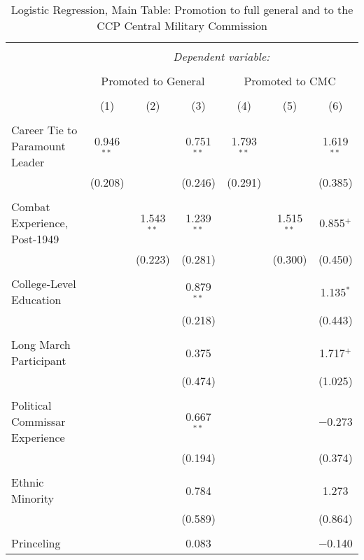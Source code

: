 
\begin{table}[!htbp] \centering 
  \caption{Logistic Regression, Main Table: Promotion to full general and to the CCP Central Military Commission} 
  \label{table_a8} 
\begin{tabular}{@{\extracolsep{5pt}}lcccccc} 
\\[-1.8ex]\hline 
\hline \\[-1.8ex] 
 & \multicolumn{6}{c}{\textit{Dependent variable:}} \\ 
\cline{2-7} 
\\[-1.8ex] & \multicolumn{3}{c}{Promoted to General} & \multicolumn{3}{c}{Promoted to CMC} \\ 
\\[-1.8ex] & (1) & (2) & (3) & (4) & (5) & (6)\\ 
\hline \\[-1.8ex] 
 Career Tie to Paramount Leader & 0.946$^{**}$ &  & 0.751$^{**}$ & 1.793$^{**}$ &  & 1.619$^{**}$ \\ 
  & (0.208) &  & (0.246) & (0.291) &  & (0.385) \\ 
  & & & & & & \\ 
 Combat Experience, Post-1949 &  & 1.543$^{**}$ & 1.239$^{**}$ &  & 1.515$^{**}$ & 0.855$^{+}$ \\ 
  &  & (0.223) & (0.281) &  & (0.300) & (0.450) \\ 
  & & & & & & \\ 
 College-Level Education &  &  & 0.879$^{**}$ &  &  & 1.135$^{*}$ \\ 
  &  &  & (0.218) &  &  & (0.443) \\ 
  & & & & & & \\ 
 Long March Participant &  &  & 0.375 &  &  & 1.717$^{+}$ \\ 
  &  &  & (0.474) &  &  & (1.025) \\ 
  & & & & & & \\ 
 Political Commissar Experience &  &  & 0.667$^{**}$ &  &  & $-$0.273 \\ 
  &  &  & (0.194) &  &  & (0.374) \\ 
  & & & & & & \\ 
 Ethnic Minority &  &  & 0.784 &  &  & 1.273 \\ 
  &  &  & (0.589) &  &  & (0.864) \\ 
  & & & & & & \\ 
 Princeling &  &  & 0.083 &  &  & $-$0.140 \\ 

\end{tabular}
\end{table}
